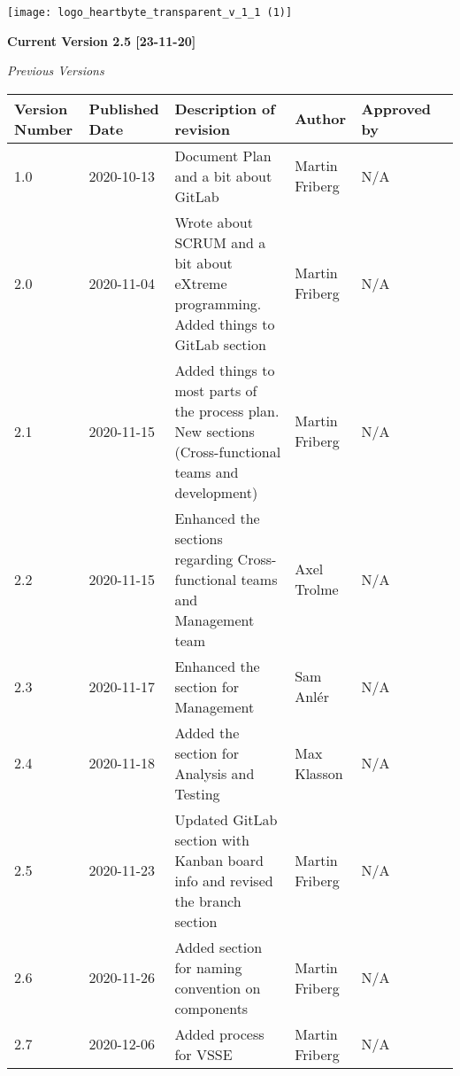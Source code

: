\maketitle
\setlength{\parskip}{0em}

\begin{center}

      \vfill
\texttt{[image: logo\_heartbyte\_transparent\_v\_1\_1 (1)]}

    \vfill
\clearpage


    \textbf{\large Current Version 2.5 [23-11-20]}
    \vspace{10mm}
    
    \emph{\large Previous Versions}
    
\begin{center}
\begin{tabular}{ | m{5em} | m{5em}| m{10em} |m{5em}| m{5em} |m{5em} |  } 
\hline
Version Number& Published Date & Description of revision & Author & Approved by \\ 
\hline
1.0 & 2020-10-13 & Document Plan and a bit about GitLab & Martin Friberg & N/A \\
\hline
2.0 & 2020-11-04 & Wrote about SCRUM and a bit about eXtreme programming. Added things to GitLab section & Martin Friberg & N/A \\ 
\hline
2.1 & 2020-11-15 & Added things to most parts of the process plan. New sections (Cross-functional teams and development) & Martin Friberg & N/A \\
\hline
2.2 & 2020-11-15 & Enhanced the sections regarding Cross-functional teams and Management team & Axel Trolme & N/A \\
\hline
2.3 & 2020-11-17 & Enhanced the section for Management & Sam Anlér & N/A \\
\hline
2.4 & 2020-11-18 & Added the section for Analysis and Testing & Max Klasson & N/A \\
\hline
2.5 & 2020-11-23 & Updated GitLab section with Kanban board info and revised the branch section & Martin Friberg & N/A \\
\hline
2.6 & 2020-11-26 & Added section for naming convention on components & Martin Friberg & N/A \\
\hline
2.7 & 2020-12-06 & Added process for VSSE & Martin Friberg & N/A \\
\hline
\end{tabular}
\end{center}

\end{center}

\clearpage
    {
 
        \renewcommand{\contentsname}{Innehåll}
        \tableofcontents
    }
    
\clearpage